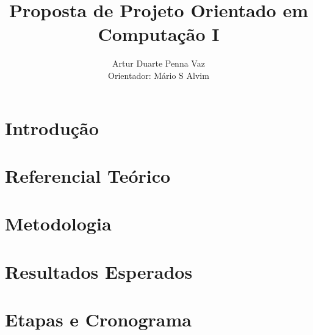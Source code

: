 \documentclass[runningheads,a4paper]{llncs2e/llncs}
\begin{document}
\mainmatter  %

\title{Proposta de Projeto Orientado em Computação I}

%
\author{Artur Duarte Penna Vaz\\
Orientador: Mário S Alvim}
%


%
%

\maketitle
\newpage
\section{Introdução}
\label{sec:introducao}


\section{Referencial Teórico}
\label{sec:referencial_teorico}


\section{Metodologia}
\label{sec:metodologia}


\section{Resultados Esperados}
\label{sec:resultados}


\section{Etapas e Cronograma}
\label{sec:etapas}





%
%
\end{document}
